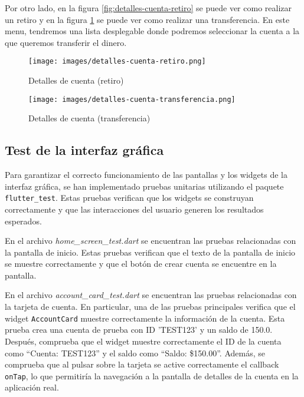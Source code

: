\documentclass[12pt]{article}
\begin{document}
Por otro lado, en la figura \ref{fig:detalles-cuenta-retiro} se puede ver como realizar un retiro y en la figura \ref{fig:detalles-cuenta-transferencia} se puede ver como realizar una transferencia. En este menu, tendremos una lista desplegable donde podremos seleccionar la cuenta a la que queremos transferir el dinero.

\begin{figure}[H]
    \centering
    \begin{minipage}[b]{0.48\textwidth}
        \centering
        \texttt{[image: images/detalles-cuenta-retiro.png]}
        \caption{Detalles de cuenta (retiro)}
        \label{fig:detalles-cuenta-retiro}
    \end{minipage}
    \hfill
    \begin{minipage}[b]{0.48\textwidth}
        \centering
        \texttt{[image: images/detalles-cuenta-transferencia.png]}
        \caption{Detalles de cuenta (transferencia)}
        \label{fig:detalles-cuenta-transferencia}
    \end{minipage}
\end{figure}

\subsection*{Test de la interfaz gráfica}

Para garantizar el correcto funcionamiento de las pantallas y los widgets de la interfaz gráfica, se han implementado pruebas unitarias utilizando el paquete \texttt{flutter\_test}. Estas pruebas verifican que los widgets se construyan correctamente y que las interacciones del usuario generen los resultados esperados.

En el archivo \textit{home\_screen\_test.dart} se encuentran las pruebas relacionadas con la pantalla de inicio. Estas pruebas verifican que el texto de la pantalla de inicio se muestre correctamente y que el botón de crear cuenta se encuentre en la pantalla.

En el archivo \textit{account\_card\_test.dart} se encuentran las pruebas relacionadas con la tarjeta de cuenta. En particular, una de las pruebas principales verifica que el widget \texttt{AccountCard} muestre correctamente la información de la cuenta. Esta prueba crea una cuenta de prueba con ID 'TEST123' y un saldo de 150.0. Después, comprueba que el widget muestre correctamente el ID de la cuenta como ``Cuenta: TEST123'' y el saldo como ``Saldo: \$150.00''. Además, se comprueba que al pulsar sobre la tarjeta se active correctamente el callback \texttt{onTap}, lo que permitiría la navegación a la pantalla de detalles de la cuenta en la aplicación real.
\end{document}
